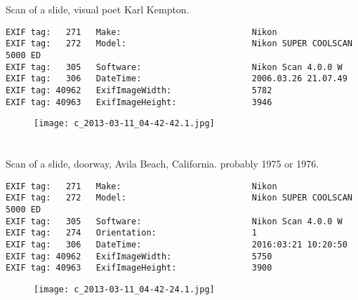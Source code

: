 \section{\protect{}}
\noindent Scan of a slide, visual poet Karl Kempton.
\noindent
\begin{lstlisting}
EXIF tag:   271   Make:                          Nikon
EXIF tag:   272   Model:                         Nikon SUPER COOLSCAN 5000 ED
EXIF tag:   305   Software:                      Nikon Scan 4.0.0 W
EXIF tag:   306   DateTime:                      2006.03.26 21.07.49
EXIF tag: 40962   ExifImageWidth:                5782
EXIF tag: 40963   ExifImageHeight:               3946

\end{lstlisting}
\clearpage
\begin{figure}
\raggedleft
\texttt{[image: c\_2013-03-11\_04-42-42.1.jpg]}
\end{figure}


\clearpage
\section{\protect{}}
\noindent Scan of a slide, doorway, Avila Beach, California. probably 1975 or 1976.
\noindent
\begin{lstlisting}
EXIF tag:   271   Make:                          Nikon
EXIF tag:   272   Model:                         Nikon SUPER COOLSCAN 5000 ED
EXIF tag:   305   Software:                      Nikon Scan 4.0.0 W
EXIF tag:   274   Orientation:                   1
EXIF tag:   306   DateTime:                      2016:03:21 10:20:50
EXIF tag: 40962   ExifImageWidth:                5750
EXIF tag: 40963   ExifImageHeight:               3900

\end{lstlisting}
\clearpage
\begin{figure}
\raggedleft
\texttt{[image: c\_2013-03-11\_04-42-24.1.jpg]}
\end{figure}


\clearpage
